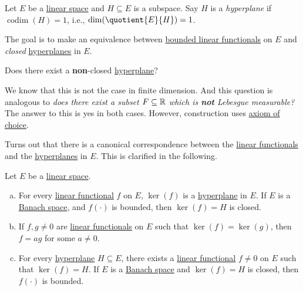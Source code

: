\begin{definition}[Hyperplane]\label{def:hyperplane}
	Let \(E\) be a \hyperref[def:linear-vector-space]{linear space} and \(H\subseteq E\) is a subspace. Say \(H\) is a \emph{hyperplane} if \(\mathop{\mathrm{codim}}(H)=1\), i.e., \(\dim (\quotient{E}{H})=1\).
\end{definition}

The goal is to make an equivalence between \hyperref[def:bounded-linear-functional]{bounded linear functionals} on \(E\) and \emph{closed} \hyperref[def:hyperplane]{hyperplanes} in \(E\).

\begin{problem}
Does there exist a \textbf{non}-closed \hyperref[def:hyperplane]{hyperplane}?
\end{problem}
\begin{answer}
	We know that this is not the case in finite dimension. And this question is analogous to \emph{does there exist a subset \(F\subseteq \mathbb{\MakeUppercase{r}} \) which is \textbf{not} Lebesgue measurable?} The answer to this is yes in both cases. However, construction uses \href{https://en.wikipedia.org/wiki/Axiom_of_choice}{axiom of choice}.
\end{answer}

Turns out that there is a canonical correspondence between the \hyperref[def:linear-functional]{linear functionals} and the \hyperref[def:hyperplane]{hyperplanes} in \(E\). This is clarified in the following.

\begin{proposition}\label{prop:lec5-2}
	Let \(E\) be a \hyperref[def:linear-vector-space]{linear space}.
	\begin{enumerate}[(a)]
		\item For every \hyperref[def:linear-functional]{linear functional} \(f\) on \(E\), \(\ker(f)\) is a \hyperref[def:hyperplane]{hyperplane} in \(E\). If \(E\) is a \hyperref[def:Banach-space]{Banach space}, and \(f(\cdot)\) is bounded, then \(\ker(f) = H\) is closed.
		\item If \(f, g \neq 0\) are \hyperref[def:linear-functional]{linear functionals} on \(E\) such that \(\ker(f) = \ker(g)\), then \(f = ag\) for some \(a \neq 0\).
		\item For every \hyperref[def:hyperplane]{hyperplane} \(H\subseteq E\), there exists a \hyperref[def:linear-functional]{linear functional} \(f \neq 0\) on \(E\) such that \(\ker(f) = H\). If \(E\) is a \hyperref[def:Banach-space]{Banach space} and \(\ker(f) = H\) is closed, then \(f(\cdot)\) is bounded.
	\end{enumerate}
\end{proposition}